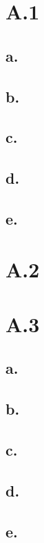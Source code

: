 \documentclass{article}
\date{{}}
\newcommand{\1}{\mathbf{1}}
\begin{document}
\thispagestyle{firstpageheader}

\section*{A.1}
{\Large 


\subsection*{a.}

\subsection*{b.}

\subsection*{c.}

\subsection*{d.}

\subsection*{e.}

}

\section*{A.2}
{\Large



}

\section*{A.3}
{\Large 

\subsection*{a.}

\subsection*{b.}

\subsection*{c.}

\subsection*{d.}

\subsection*{e.}

}
\end{document}
